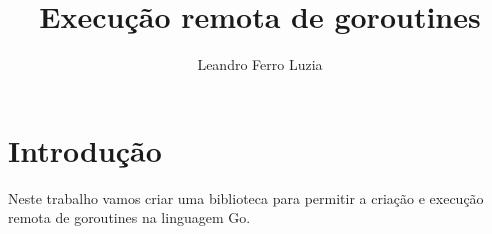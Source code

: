 \documentclass[a4paper,11pt]{article}
\author{Leandro Ferro Luzia}
\title{Execução remota de goroutines}
\begin{document}
\maketitle
\tableofcontents
\section{Introdução}
Neste trabalho vamos criar uma biblioteca para permitir a criação e execução remota de goroutines
na linguagem Go.
\end{document}
